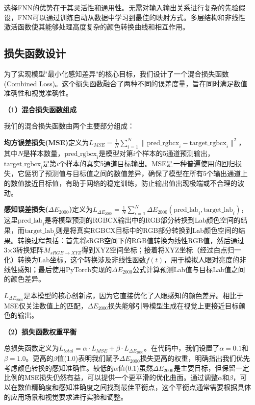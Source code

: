 选择FNN的优势在于其灵活性和通用性。无需对输入输出关系进行复杂的先验假设，FNN可以通过训练自动从数据中学习到最佳的映射方式。多层结构和非线性激活函数使其能够处理高度复杂的颜色转换曲线和相互作用。\cite{1024493909.nh}

\subsection[\hspace{-2pt}损失函数设计]{{\heiti{} \hspace{-8pt}损失函数设计}}\label{section2: 损失函数设计}

为了实现模型"最小化感知差异"的核心目标，我们设计了一个混合损失函数 (Combined Loss)。这个损失函数融合了两种不同的误差度量，旨在同时满足数值准确性和视觉准确性。

\noindent\textbf{（1）混合损失函数组成}

我们的混合损失函数由两个主要部分组成：

\textbf{均方误差损失(MSE)}定义为$ L_{MSE} = \frac{1}{N} \sum_{i=1}^N \| \text{pred\_rgbcx}_i - \text{target\_rgbcx}_i \|^2 $，其中$N$是样本数量，$\text{pred\_rgbcx}_i$是模型对第$i$个样本的5通道预测输出，$\text{target\_rgbcx}_i$是第$i$个样本的真实5通道目标输出。MSE是一种普遍使用的回归损失，它惩罚了预测值与目标值之间的数值差异，确保了模型在所有5个输出通道上的数值接近目标值，有助于网络的稳定训练，防止输出值出现极端或不合理的波动。

\textbf{感知误差损失($\Delta E_{2000}$)}定义为$ L_{\Delta E_{2000}} = \frac{1}{N} \sum_{i=1}^N \Delta E_{2000}(\text{pred\_lab}_i, \text{target\_lab}_i) $\cite{YSZL200407020,BZGC200606058}，这里$\text{pred\_lab}_i$是将模型预测的RGBCX输出中的RGB部分转换到Lab颜色空间的结果，而$\text{target\_lab}_i$则是将真实RGBCX目标中的RGB部分转换到Lab颜色空间的结果。转换过程包括：首先将sRGB空间下的RGB值转换为线性RGB值，然后通过3×3转换矩阵$M_{sRGB \to XYZ}$得到XYZ空间坐标；接着将XYZ坐标（经过白点归一化）转换为Lab坐标，这个转换涉及非线性函数$f(t)$，用于模拟人眼对亮度的非线性感知；最后使用PyTorch实现的$\Delta E_{2000}$公式计算预测Lab值与目标Lab值之间的颜色差异。

$L_{\Delta E_{2000}}$是本模型的核心创新点，因为它直接优化了人眼感知的颜色差异。相比于MSE仅关注数值上的匹配，$\Delta E_{2000}$损失能够引导模型生成在视觉上更接近目标颜色的输出。

\noindent\textbf{（2）损失函数权重平衡}

总损失函数定义为$ L_{total} = \alpha \cdot L_{MSE} + \beta \cdot L_{\Delta E_{2000}} $。在代码中，我们设置了$\alpha=0.1$和$\beta=1.0$。更高的$\beta$值(1.0)表明我们赋予$\Delta E_{2000}$损失更高的权重，明确指出我们优先考虑颜色转换的感知准确性。较低的$\alpha$值(0.1)虽然$\Delta E_{2000}$是主要目标，但保留一定比例的MSE损失仍然有益，可以提供一个更平滑的优化曲面。通过调整$\alpha$和$\beta$，可以在数值精确度和感知准确度之间找到最佳平衡点，这个平衡点通常需要根据具体的应用场景和视觉要求进行实验和调整。

